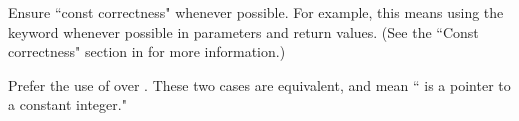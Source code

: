 \be
\item Ensure ``const correctness" whenever possible. For example, this means using the  keyword whenever possible
      in parameters and return values. (See the ``Const correctness" section in \cite{Cl2010} for more information.)
\item Prefer the use of  over .  These two cases are equivalent, and mean `` is a pointer to
a constant integer."
\ee
